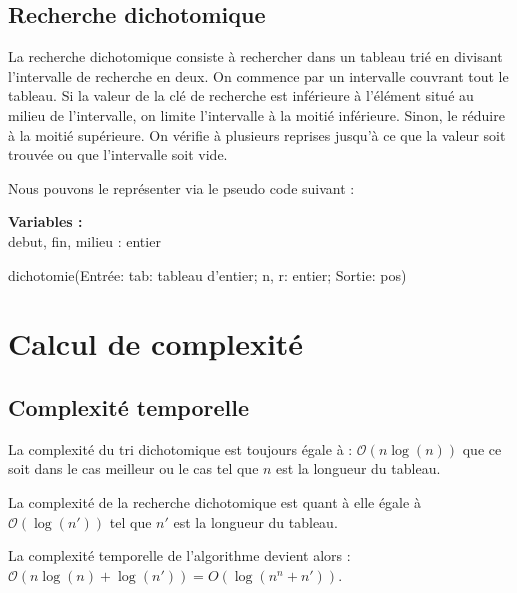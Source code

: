 \subsection{Recherche dichotomique}
La recherche dichotomique consiste à rechercher dans un tableau trié en divisant l'intervalle de recherche en deux.
On commence par un intervalle couvrant tout le tableau. Si la valeur de la clé de recherche est inférieure à l'élément situé au milieu de l'intervalle, on limite l'intervalle à la moitié inférieure. Sinon, le réduire à la moitié supérieure. On vérifie à plusieurs reprises jusqu'à ce que la valeur soit trouvée ou que l'intervalle soit vide.
\par
Nous pouvons le représenter via le pseudo code suivant :

\begin{function}[H]
    \textbf{Variables :}\\
    debut, fin, milieu : entier\;
    \caption{dichotomie(Entrée: tab: tableau d'entier; n, r: entier; Sortie: pos)}
\end{function}

\section{Calcul de complexité}
\subsection{Complexité temporelle}
La complexité du tri dichotomique est toujours égale à : $\mathcal{O}(n \log(n))$ que ce soit dans le cas meilleur ou le cas tel que $n$ est la longueur du tableau.
\par
La complexité de la recherche dichotomique  est quant à elle égale à $\mathcal{O}(\log(n'))$ tel que $n'$ est la longueur du tableau.
\par
La complexité temporelle de l'algorithme devient alors : $\mathcal{O}(n \log(n) + \log(n')) = {O}(\log(n^n + n'))$.\\

